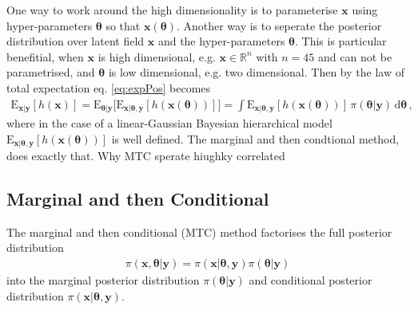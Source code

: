 One way to work around the high dimensionality is to parameterise $\bm{x}$ using hyper-parameters $\bm{\theta}$ so that $\bm{x}(\bm{\theta})$. 
Another way is to seperate the posterior distribution over latent field $\bm{x}$ and the hyper-parameters $\bm{\theta}$.
This is particular benefitial, when $\bm{x}$ is high dimensional, e.g. $\bm{x} \in \mathbb{R}^n$ with $n = 45$ and can not be parametrised, and $\bm{\theta}$ is low dimensional, e.g. two dimensional.
Then by the law of total expectation \cite{champ2022generalizedlawtotalcovariance} eq. \ref{eq:expPos} becomes
\begin{align}
	\text{E}_{\bm{x}|\bm{y}} [h(\bm{x})] = \text{E}_{\bm{\theta}|\bm{y}}   \big[ \text{E}_{\bm{x}|\bm{\theta},\bm{y}} [h(\bm{x}(\bm{\theta}))] \big]=  \int 	\text{E}_{\bm{x}| \bm{\theta},\bm{y}}  [h(\bm{x}(\bm{\theta}))] \,  \pi( \bm{\theta} | \bm{y} )  \, \text{d} \bm{\theta}   \label{eq:MargExpPos} \, ,
\end{align}
where in the case of a linear-Gaussian Bayesian hierarchical model $\text{E}_{\bm{x}| \bm{\theta},\bm{y}}  [h(\bm{x}(\bm{\theta}))]$ is well defined.
The marginal and then condtional method, does exactly that.
Why MTC sperate hiughky correlated \cite{}

\subsection{Marginal and then Conditional}
\label{subsec:MTC}
The marginal and then conditional (MTC) method factorises the full posterior distribution 
\begin{align}
	\pi(\bm{x}, \bm{\theta}|\bm{y}) = \pi(\bm{x}| \bm{\theta}, \bm{y}) \pi(\bm{\theta}|\bm{y})
\end{align}
into the marginal posterior distribution $ \pi(\bm{\theta}|\bm{y})$ and conditional posterior distribution $\pi(\bm{x}| \bm{\theta}, \bm{y})$.


